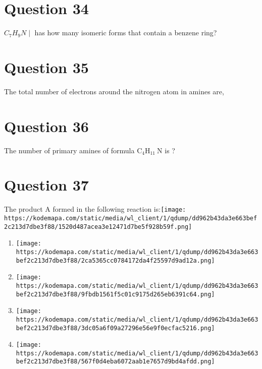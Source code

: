 \documentclass{article}
\begin{document}
\section*{Question 34}
\(C_7 H_9 N \mid\) has how many isomeric forms that contain a benzene ring? 
\begin{enumerate}[label=(\alph*)]
\end{enumerate}
\newpage
\section*{Question 35}
The total number of electrons around the nitrogen atom in amines are, 
\begin{enumerate}[label=(\alph*)]
\end{enumerate}
\newpage
\section*{Question 36}
The number of primary amines of formula \(\mathrm{C}_4 \mathrm{H}_{11} \mathrm{~N}\) is ? 
\begin{enumerate}[label=(\alph*)]
\end{enumerate}
\newpage
\section*{Question 37}
The product A formed in the following reaction is:\texttt{[image: https://kodemapa.com/static/media/wl\_client/1/qdump/dd962b43da3e663bef2c213d7dbe3f88/1520d487acea3e12471d7be5f928b59f.png]}\newline\newline
\begin{enumerate}[label=(\alph*)]
\item \texttt{[image: https://kodemapa.com/static/media/wl\_client/1/qdump/dd962b43da3e663bef2c213d7dbe3f88/2ca5365cc0784172da4f25597d9ad12a.png]}
\item \texttt{[image: https://kodemapa.com/static/media/wl\_client/1/qdump/dd962b43da3e663bef2c213d7dbe3f88/9fbdb1561f5c01c9175d265eb6391c64.png]}
\item \texttt{[image: https://kodemapa.com/static/media/wl\_client/1/qdump/dd962b43da3e663bef2c213d7dbe3f88/3dc05a6f09a27296e56e9f0ecfac5216.png]}
\item \texttt{[image: https://kodemapa.com/static/media/wl\_client/1/qdump/dd962b43da3e663bef2c213d7dbe3f88/567f0d4eba6072aab1e7657d9bd4afdd.png]}
\end{enumerate}
\newpage
\end{document}
